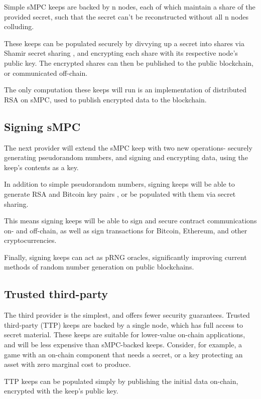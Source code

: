 \documentclass[11pt]{article}
\begin{document}
Simple sMPC keeps are backed by n nodes, each of which maintain a
share of the provided secret, such that the secret can't be
reconstructed without all n nodes colluding.

These keeps can be populated securely by divvying up a secret into
shares via Shamir secret sharing \cite{shamir}, and encrypting each
share with its respective node's public key. The encrypted shares can
then be published to the public blockchain, or communicated off-chain.

The only computation these keeps will run is an implementation of
distributed RSA \cite{mauland2009realizing} on sMPC, used to publish
encrypted data to the blockchain.


\subsection{Signing sMPC}

The next provider will extend the sMPC keep with two new operations-
securely generating pseudorandom numbers, and signing and encrypting
data, using the keep's contents as a key.

In addition to simple pseudorandom numbers, signing keeps will be able
to generate RSA \cite{mauland2009realizing} and Bitcoin key pairs
\cite{coinparty}, or be populated with them via secret sharing.

This means signing keeps will be able to sign and secure contract
communications on- and off-chain, as well as sign transactions for
Bitcoin, Ethereum, and other cryptocurrencies.

Finally, signing keeps can act as pRNG oracles, significantly
improving current methods of random number generation on public
blockchains.


\subsection{Trusted third-party}

The third provider is the simplest, and offers fewer security
guarantees. Trusted third-party (TTP) keeps are backed by a single
node, which has full access to secret material. These keeps are
suitable for lower-value on-chain applications, and will be less
expensive than sMPC-backed keeps. Consider, for example, a game with
an on-chain component that needs a secret, or a key protecting an
asset with zero marginal cost to produce.

TTP keeps can be populated simply by publishing the initial data
on-chain, encrypted with the keep's public key.
\end{document}
